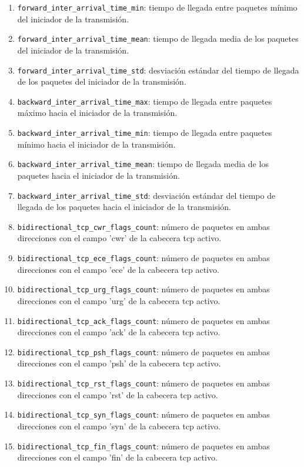 \begin{enumerate}
  \item \texttt{forward\_inter\_arrival\_time\_min}: tiempo de llegada entre paquetes mínimo del iniciador de la transmisión.
  \item \texttt{forward\_inter\_arrival\_time\_mean}: tiempo de llegada media de los paquetes del iniciador de la transmisión.
  \item \texttt{forward\_inter\_arrival\_time\_std}: desviación estándar del tiempo de llegada de los paquetes del iniciador de la transmisión.
  \item \texttt{backward\_inter\_arrival\_time\_max}: tiempo de llegada entre paquetes máximo hacia el iniciador de la transmisión.
  \item \texttt{backward\_inter\_arrival\_time\_min}: tiempo de llegada entre paquetes mínimo hacia el iniciador de la transmisión.
  \item \texttt{backward\_inter\_arrival\_time\_mean}: tiempo de llegada media de los paquetes hacia el iniciador de la transmisión.
  \item \texttt{backward\_inter\_arrival\_time\_std}: desviación estándar del tiempo de llegada de los paquetes hacia el iniciador de la transmisión.
  \item \texttt{bidirectional\_tcp\_cwr\_flags\_count}: número de paquetes en ambas direcciones con el campo 'cwr' de la cabecera \acrshort{tcp} activo.
  \item \texttt{bidirectional\_tcp\_ece\_flags\_count}: número de paquetes en ambas direcciones con el campo 'ece' de la cabecera \acrshort{tcp} activo.
  \item \texttt{bidirectional\_tcp\_urg\_flags\_count}: número de paquetes en ambas direcciones con el campo 'urg' de la cabecera \acrshort{tcp} activo.
  \item \texttt{bidirectional\_tcp\_ack\_flags\_count}: número de paquetes en ambas direcciones con el campo 'ack' de la cabecera \acrshort{tcp} activo.
  \item \texttt{bidirectional\_tcp\_psh\_flags\_count}: número de paquetes en ambas direcciones con el campo 'psh' de la cabecera \acrshort{tcp} activo.
  \item \texttt{bidirectional\_tcp\_rst\_flags\_count}: número de paquetes en ambas direcciones con el campo 'rst' de la cabecera \acrshort{tcp} activo.
  \item \texttt{bidirectional\_tcp\_syn\_flags\_count}: número de paquetes en ambas direcciones con el campo 'syn' de la cabecera \acrshort{tcp} activo.
  \item \texttt{bidirectional\_tcp\_fin\_flags\_count}: número de paquetes en ambas direcciones con el campo 'fin' de la cabecera \acrshort{tcp} activo.

\end{enumerate}
